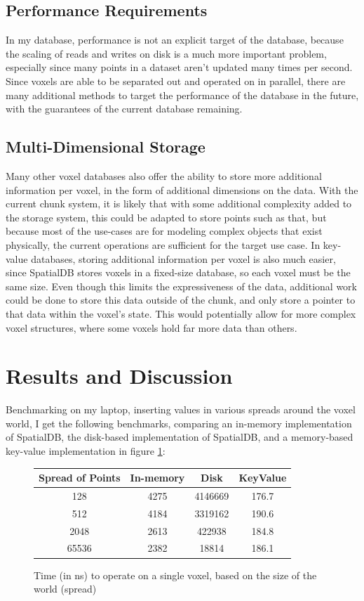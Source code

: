 \documentclass[10pt,twocolumn]{article}
\begin{document}
\subsection{Performance Requirements}

In my database, performance is not an explicit target of the database, because
the scaling of reads and writes on disk is a much more important problem,
especially since many points in a dataset aren't updated many times per second.
Since voxels are able to be separated out and operated on in parallel, there are
many additional methods to target the performance of the database in the future,
with the guarantees of the current database remaining.


\subsection{Multi-Dimensional Storage}

Many other voxel databases also offer the ability to store more additional
information per voxel, in the form of additional dimensions on the data. With
the current chunk system, it is likely that with some additional complexity
added to the storage system, this could be adapted to store points such as that,
but because most of the use-cases are for modeling complex objects that exist
physically, the current operations are sufficient for the target use case. In
key-value databases, storing additional information per voxel is also much
easier, since SpatialDB stores voxels in a fixed-size database, so each voxel
must be the same size. Even though this limits the expressiveness of the data,
additional work could be done to store this data outside of the chunk, and only
store a pointer to that data within the voxel's state. This would potentially
allow for more complex voxel structures, where some voxels hold far more data
than others.

\section{Results and Discussion}

Benchmarking on my laptop, inserting values in various spreads around the voxel
world, I get the following benchmarks, comparing an in-memory implementation of
SpatialDB, the disk-based implementation of SpatialDB, and a memory-based
key-value implementation in figure \ref{fig:reads}:

\begin{figure}
  \centering
  \begin{tabular}{c | c | c | c}
    Spread of Points & In-memory & Disk & KeyValue\\
    \hline
    128 & 4275 & 4146669 & 176.7\\
    512 & 4184 & 3319162 & 190.6\\
    2048 & 2613 & 422938 & 184.8\\
    65536 & 2382 & 18814 & 186.1
  \end{tabular}
  \caption{Time (in ns) to operate on a single voxel, based on the size of the
  world (spread)}
  \label{fig:reads}
\end{figure}
\end{document}
